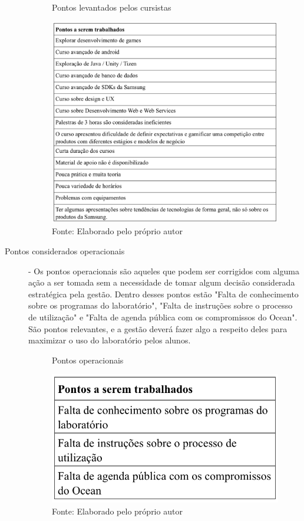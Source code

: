 \begin{description}
\begin{figure}[H]
\caption{Pontos levantados pelos cursistas}
\centerline{\includegraphics[scale=0.75]{img/pontosselecionadoscursistas}}
\label{fig:pontosselecionadoscursistas}
\caption* {Fonte: Elaborado pelo próprio autor}
\end{figure}

\item[Pontos considerados operacionais] - Os pontos operacionais são aqueles que podem ser corrigidos com alguma ação a ser tomada sem a necessidade de tomar algum decisão considerada estratégica pela gestão. Dentro desses pontos estão "Falta de conhecimento sobre os programas do laboratório", "Falta de instruções sobre o processo de utilização" e "Falta de agenda pública com os compromissos do Ocean". São pontos relevantes, e a gestão deverá fazer algo a respeito deles para maximizar o uso do laboratório pelos alunos.

\begin{figure}[H]
\caption{Pontos operacionais}
\centerline{\includegraphics[scale=0.75]{img/pontosselecionadosoperacionais}}
\label{fig:pontosselecionadosoperacionais}
\caption* {Fonte: Elaborado pelo próprio autor}
\end{figure}


\end{description}

